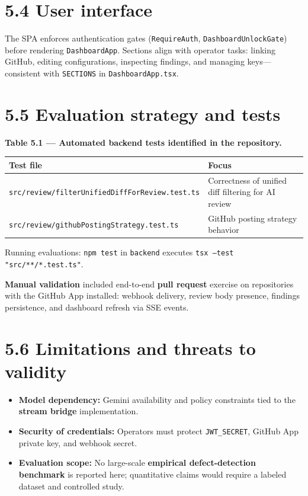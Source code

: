 \documentclass[11pt,a4paper]{report}
\begin{document}
\section{5.4 User interface}


The SPA enforces authentication gates (\texttt{RequireAuth}, \texttt{DashboardUnlockGate}) before rendering \texttt{DashboardApp}. Sections align with operator tasks: linking GitHub, editing configurations, inspecting findings, and managing keys—consistent with \texttt{SECTIONS} in \texttt{DashboardApp.tsx}.


\section{5.5 Evaluation strategy and tests}


\textbf{Table 5.1 — Automated backend tests identified in the repository.}


\begingroup\small
\begin{tabular}{@{}p{}p{}@{}}
\toprule
Test file & Focus \\
\midrule
\texttt{src/review/filterUnifiedDiffForReview.test.ts} & Correctness of unified diff filtering for AI review \\
\texttt{src/review/githubPostingStrategy.test.ts} & GitHub posting strategy behavior \\
\bottomrule
\end{tabular}
\endgroup


Running evaluations: \texttt{npm test} in \texttt{backend} executes \texttt{tsx --test "src/**/*.test.ts"}.


\textbf{Manual validation} included end-to-end \textbf{pull request} exercise on repositories with the GitHub App installed: webhook delivery, review body presence, findings persistence, and dashboard refresh via SSE events.


\section{5.6 Limitations and threats to validity}


\begin{itemize}
\item \textbf{Model dependency:} Gemini availability and policy constraints tied to the \textbf{stream bridge} implementation.
\item \textbf{Security of credentials:} Operators must protect \texttt{JWT\_SECRET}, GitHub App private key, and webhook secret.
\item \textbf{Evaluation scope:} No large-scale \textbf{empirical defect-detection benchmark} is reported here; quantitative claims would require a labeled dataset and controlled study.
\end{itemize}
\end{document}
